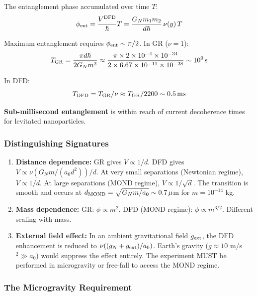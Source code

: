 \documentclass[11pt,a4paper]{article}
\begin{document}
The entanglement phase accumulated over time $T$:
\begin{equation}
\phi_{\rm ent} = \frac{V^{\rm DFD}}{\hbar}T = \frac{G_N m_1 m_2}{d\hbar}\,\nu(y)\,T
\end{equation}

Maximum entanglement requires $\phi_{\rm ent} \sim \pi/2$. In GR ($\nu = 1$):
\begin{equation}
T_{\rm GR} = \frac{\pi d\hbar}{2G_N m^2} \approx \frac{\pi\times2\times10^{-4}\times10^{-34}}{2\times6.67\times10^{-11}\times10^{-28}} \sim 10^{0}\,\text{s}
\end{equation}

In DFD:
\begin{equation}
T_{\rm DFD} = T_{\rm GR}/\nu \approx T_{\rm GR}/2200 \sim 0.5\,\text{ms}
\end{equation}

\textbf{Sub-millisecond entanglement} is within reach of current decoherence times for levitated nanoparticles.

\subsubsection{Distinguishing Signatures}

\begin{enumerate}
\item \textbf{Distance dependence:} GR gives $V \propto 1/d$. DFD gives $V \propto \nu(G_Nm/(a_0d^2))/d$. At very small separations (Newtonian regime), $V \propto 1/d$. At large separations (MOND regime), $V \propto 1/\sqrt{d}$. The transition is smooth and occurs at $d_{\rm MOND} = \sqrt{G_Nm/a_0} \sim 0.7\,\mu$m for $m = 10^{-14}$ kg.

\item \textbf{Mass dependence:} GR: $\phi \propto m^2$. DFD (MOND regime): $\phi \propto m^{3/2}$. Different scaling with mass.

\item \textbf{External field effect:} In an ambient gravitational field $g_{\rm ext}$, the DFD enhancement is reduced to $\nu((g_N + g_{\rm ext})/a_0)$. Earth's gravity ($g \approx 10$ m/s$^2 \gg a_0$) would suppress the effect entirely. The experiment MUST be performed in microgravity or free-fall to access the MOND regime.
\end{enumerate}

\subsubsection{The Microgravity Requirement}
\end{document}
